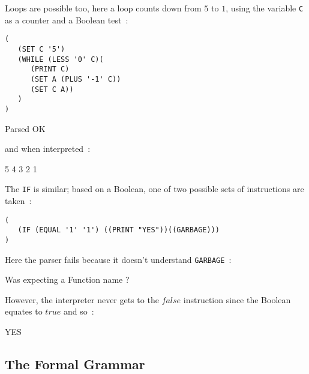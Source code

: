 Loops are possible too, here a loop counts down from $5$ to $1$, using the variable \verb^C^ as a counter and a Boolean test~:
\begin{verbatim}
(
   (SET C '5')
   (WHILE (LESS '0' C)(
      (PRINT C)
      (SET A (PLUS '-1' C))
      (SET C A))
   )
)
\end{verbatim}
\begin{terminaloutput}
Parsed OK
\end{terminaloutput}
\noindent and when interpreted~:
\begin{terminaloutput}
5
4
3
2
1
\end{terminaloutput}

\noindent The \verb^IF^ is similar; based on a Boolean, one of two possible sets of instructions are taken~:
\begin{verbatim}
(
   (IF (EQUAL '1' '1') ((PRINT "YES"))((GARBAGE)))
)
\end{verbatim}
Here the parser fails because it doesn't understand \verb^GARBAGE^~:
\begin{terminaloutput}
Was expecting a Function name ?
\end{terminaloutput}
However, the interpreter never gets to the $false$ instruction since the Boolean equates to $true$ and so~:
\begin{terminaloutput}
YES
\end{terminaloutput}


\subsection*{The Formal Grammar}


